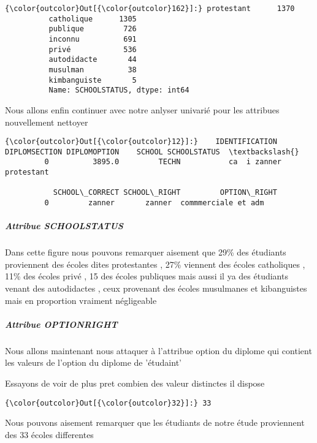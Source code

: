 \documentclass[11pt]{article}
\begin{document}
            \begin{Verbatim}[commandchars=\\\{\}]
{\color{outcolor}Out[{\color{outcolor}162}]:} protestant      1370
          catholique      1305
          publique         726
          inconnu          691
          privé            536
          autodidacte       44
          musulman          38
          kimbanguiste       5
          Name: SCHOOLSTATUS, dtype: int64
\end{Verbatim}
        
    Nous allons enfin continuer avec notre anlyser univarié pour les
attribues nouvellement nettoyer

            \begin{Verbatim}[commandchars=\\\{\}]
{\color{outcolor}Out[{\color{outcolor}12}]:}    IDENTIFICATION DIPLOMSECTION DIPLOMOPTION    SCHOOL SCHOOLSTATUS  \textbackslash{}
         0          3895.0         TECHN           ca  i zanner   protestant   
         
           SCHOOL\_CORRECT SCHOOL\_RIGHT         OPTION\_RIGHT  
         0         zanner       zanner  commmerciale et adm  
\end{Verbatim}
        
    \subparagraph{Attribue SCHOOLSTATUS}\label{attribue-schoolstatus}

    Dans cette figure nous pouvons remarquer aisement que 29\% des étudiants
proviennent des écoles dites protestantes , 27\% viennent des écoles
catholiques , 11\% des écoles privé , 15 des écoles publiques mais aussi
il ya des étudiants venant des autodidactes , ceux provenant des écoles
musulmanes et kibanguistes mais en proportion vraiment négligeable

    \subparagraph{Attribue OPTIONRIGHT}\label{attribue-optionright}

    Nous allons maintenant nous attaquer à l'attribue option du diplome qui
contient les valeurs de l'option du diplome de 'étudaint'

    Essayons de voir de plus pret combien des valeur distinctes il dispose

            \begin{Verbatim}[commandchars=\\\{\}]
{\color{outcolor}Out[{\color{outcolor}32}]:} 33
\end{Verbatim}
        
    Nous pouvons aisement remarquer que les étudiants de notre étude
proviennent des 33 écoles differentes
\end{document}
